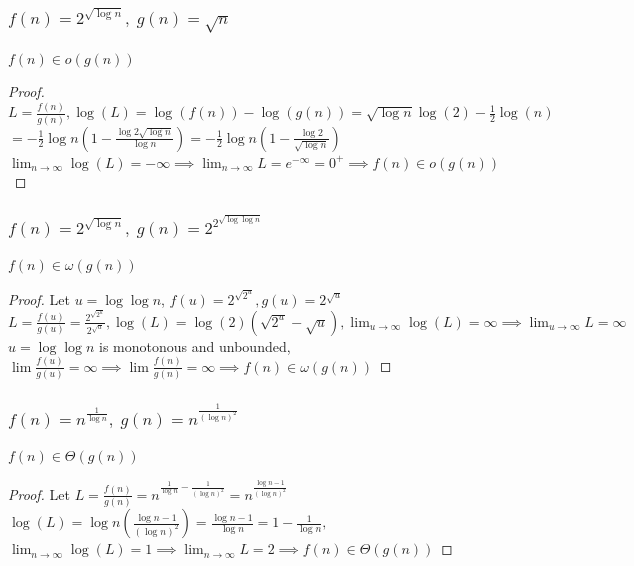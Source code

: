 \documentclass[9pt]{extarticle}
\begin{document}
\subsubsection{$f(n) = 2^{\sqrt{\log n}},\; g(n) = \sqrt{n}$}
$f(n) \in o(g(n))$
\begin{proof}
    $L = \frac{f(n)}{g(n)}, \log(L) = \log(f(n)) - \log(g(n)) = \sqrt{\log n}\log(2) - \frac{1}{2} \log(n) $\\
    $= -\frac{1}{2}\log n (1 - \frac{\log 2 \sqrt{\log n}}{\log n}) = -\frac{1}{2}\log n (1 - \frac{\log 2 }{\sqrt{\log n}}) $\\
    $\lim_{n\rightarrow\infty} \log(L) = -\infty \implies \lim_{n\rightarrow\infty} L = e^{-\infty} = 0^+ \implies f(n) \in o(g(n))$ 
\end{proof}

\subsubsection{$f(n) = 2^{\sqrt{\log n}},\; g(n) = 2^{2^{\sqrt{\log\log n}}}$}
$f(n) \in \omega(g(n))$
\begin{proof}
Let $u = \log\log n$, $f(u) = 2^{\sqrt{2^u}}, g(u) = 2^{\sqrt{u}}$\\
$L = \frac{f(u)}{g(u)} = \frac{2^{\sqrt{2^u}}}{2^{\sqrt{u}}}, \log(L) = \log(2) (\sqrt{2^u} - \sqrt{u}), \lim_{u \rightarrow \infty}\log(L) = \infty \implies
\lim_{u \rightarrow \infty}L = \infty$\\
$u = \log\log n $ is monotonous and unbounded, $\lim \frac{f(u)}{g(u)} = \infty \implies \lim \frac{f(n)}{g(n)} = \infty \implies f(n) \in \omega(g(n)) $
\end{proof}


\subsubsection{$f(n) = n^{\frac{1}{\log n}},\; g(n) = n^{\frac{1}{(\log n)^2}}$}
$f(n) \in \Theta(g(n))$
\begin{proof}
    Let $L = \frac{f(n)}{g(n)} = n^{\frac{1}{\log n} - \frac{1}{(\log n)^2}} = n^{\frac{\log n - 1}{(\log n)^2}}$\\
    $\log(L) = \log n (\frac{\log n - 1}{(\log n)^2}) = \frac{\log n - 1}{\log n} = 1 - \frac{1}{\log n}, $\\
    $\lim_{n \rightarrow \infty} \log(L) = 1 \implies \lim_{n \rightarrow \infty} L = 2 \implies f(n) \in \Theta(g(n))$
\end{proof}
\end{document}
